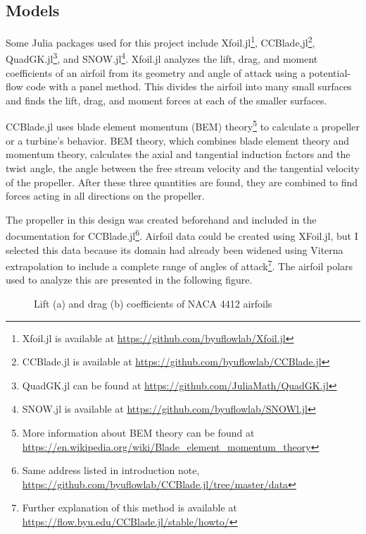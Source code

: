 \documentclass[journal ]{new-aiaa}
\begin{document}
\subsection{Models}

Some Julia packages used for this project include Xfoil.jl\footnote{Xfoil.jl is available at \url{https://github.com/byuflowlab/Xfoil.jl}}, CCBlade,jl\footnote{CCBlade.jl is available at \url{https://github.com/byuflowlab/CCBlade.jl}}, QuadGK.jl\footnote{QuadGK.jl can be found at \url{https://github.com/JuliaMath/QuadGK.jl}}, and SNOW.jl\footnote{SNOW.jl is available at \url{https://github.com/byuflowlab/SNOWl.jl}}. Xfoil.jl analyzes the lift, drag, and moment coefficients of an airfoil from its geometry and angle of attack using a potential-flow code with a panel method. This divides the airfoil into many small surfaces and finds the lift, drag, and moment forces at each of the smaller surfaces. 

CCBlade.jl uses blade element momentum (BEM) theory\footnote{More information about BEM theory can be found at \url{https://en.wikipedia.org/wiki/Blade_element_momentum_theory}} to calculate a propeller or a turbine's behavior. BEM theory, which combines blade element theory and momentum theory, calculates the axial and tangential induction factors and the twist angle, the angle between the free stream velocity and the tangential velocity of the propeller. After these three quantities are found, they are combined to find forces acting in all directions on the propeller\cite{CCBlade}.

The propeller in this design was created beforehand and included in the documentation for CCBlade.jl\footnote{Same address listed in introduction note, \url{https://github.com/byuflowlab/CCBlade.jl/tree/master/data}}. Airfoil data could be created using XFoil.jl, but I selected this data because its domain had already been widened using Viterna extrapolation to include a complete range of angles of attack\footnote{Further explanation of this method is available at \url{https://flow.byu.edu/CCBlade.jl/stable/howto/}}. The airfoil polars used to analyze this are presented in the following figure. 

\begin{figure}[H]
\centering
	\caption{Lift (a) and drag (b) coefficients of NACA 4412 airfoils}
	\captionsetup{aboveskip=0pt,font=it}
	\label{afplot}
\end{figure}
\end{document}
